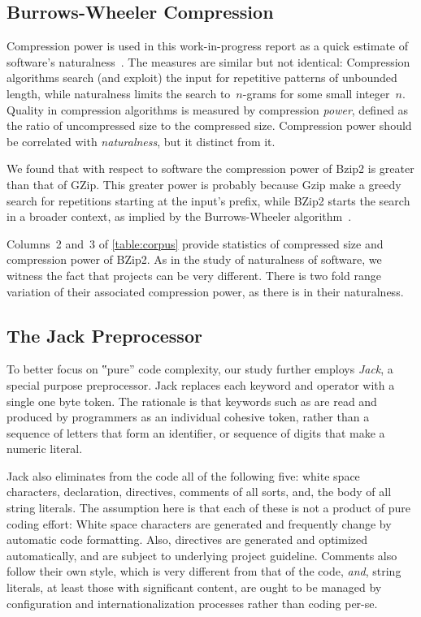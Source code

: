 \subsection{Burrows-Wheeler Compression}
Compression power is used in this work-in-progress report as a quick estimate
of software's naturalness~\cite{Hindle:Bar:Su:Gabel:Devanbu:2012}. The
measures are similar but not identical: Compression algorithms search
(and exploit) the input for repetitive patterns of unbounded length, while
naturalness limits the search to~$n$-grams for some small integer~$n$. Quality
in compression algorithms is measured by compression \emph{power}, defined as
the ratio of uncompressed size to the compressed size. Compression power should
be correlated with \emph{naturalness}, but it distinct from it.

We found that with respect to \Java software the compression power of Bzip2 is
greater than that of GZip. This greater power is probably because Gzip make a
greedy search for repetitions starting at the input's prefix, while BZip2
starts the search in a broader context, as implied by the Burrows-Wheeler
algorithm~\cite{Burrows:Wheeler:94}.

Columns~2 and~3 of \cref{table:corpus} provide statistics of compressed size
and compression power of BZip2. As in the study of
naturalness of software, we witness the fact that projects can be very
different. There is two fold range variation of their associated compression
power, as there is in their naturalness.

\subsection{The Jack Preprocessor}

To better focus on ‟pure” code complexity, our study further employs
\emph{Jack}, a special purpose preprocessor. Jack replaces each keyword and
operator with a single one byte token. The rationale is that keywords such as
 are read and produced by programmers as an individual cohesive
token, rather than a sequence of letters that form an identifier, or sequence
of digits that make a numeric literal.

Jack also eliminates from the \Java code all of the following five: white space
characters,  declaration,  directives, comments of all
sorts, and, the body of all string literals. The assumption here is that each
of these is not a product of pure coding effort: White space characters are
generated and frequently change by automatic code formatting. Also, 
directives are generated and optimized automatically, and are subject to
underlying project guideline. Comments also follow their own style, which is
very different from that of the code, \emph{and}, string literals, at least
those with significant content, are ought to be managed by configuration and
internationalization processes rather than coding per-se.

